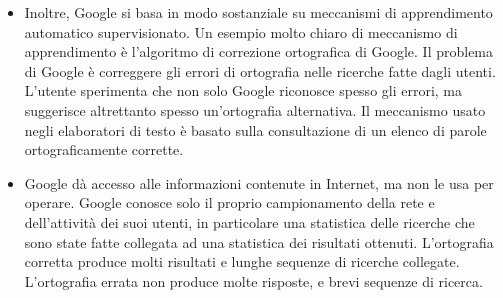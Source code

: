 \documentclass[xcolor=svgnames]{beamer}
\begin{document}
\begin{frame}
\begin{itemize}
\item Inoltre, Google si basa in modo sostanziale su meccanismi di apprendimento automatico supervisionato. Un esempio molto chiaro di meccanismo di apprendimento è l'algoritmo di correzione ortografica di Google. Il problema di Google è correggere gli errori di ortografia nelle ricerche fatte dagli utenti. L'utente sperimenta che non solo Google riconosce spesso gli errori, ma suggerisce altrettanto spesso un'ortografia alternativa. Il meccanismo usato negli elaboratori di testo è basato sulla consultazione di un elenco di parole ortograficamente corrette.
  \item Google dà accesso alle informazioni contenute in Internet, ma non le usa per operare. Google conosce solo il proprio campionamento della rete e dell'attività dei suoi utenti, in particolare una statistica delle ricerche che sono state fatte collegata ad una statistica dei risultati ottenuti. L'ortografia corretta produce molti risultati e lunghe sequenze di ricerche collegate. L'ortografia errata non produce molte risposte, e brevi sequenze di ricerca.
  \end{itemize}
\end{frame}
\end{document}
